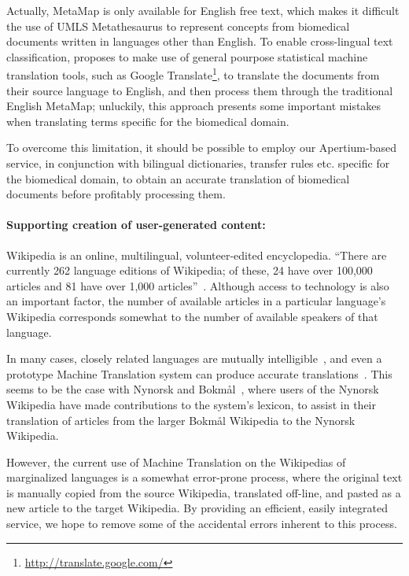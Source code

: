 \documentclass[11pt]{article}
\begin{document}
Actually, MetaMap is only available for English free text, which makes it difficult the use of UMLS Metathesaurus to represent concepts from biomedical documents written in languages other than English. To enable cross-lingual text classification, \cite{metamapes} proposes to make use of general pourpose statistical machine translation tools, such as Google %
Translate\footnote{\small\url{http://translate.google.com/}}, to translate the documents from their source language to English, and then process them through the traditional English MetaMap; unluckily, this approach presents some important mistakes when translating terms specific for the biomedical domain.

To overcome this limitation, it should be possible to employ our Apertium-based service, in conjunction with bilingual dictionaries, transfer rules etc. specific for the biomedical domain, to obtain an accurate translation of biomedical documents before profitably processing them.

\paragraph{Supporting creation of user-generated content:} Wikipedia is an online, multilingual, volunteer-edited encyclopedia. ``There are currently 262 language editions of Wikipedia; of these, 24 have over 100,000 articles and 81 have over 1,000 articles''~\citep{wikipedia}. Although access to technology is also an important factor, the number of available articles in a particular language's Wikipedia corresponds somewhat to the number of available speakers of that language.

In many cases, closely related languages are mutually intelligible~\citep{tyers09a}, and even a prototype Machine Translation system can produce accurate translations~\citep{oller06}. This seems to be the case with Nynorsk and Bokmål~\citep{unhammer09}, where users of the Nynorsk Wikipedia have made contributions to the system's lexicon, to assist in their translation of articles from the larger Bokmål Wikipedia to the Nynorsk Wikipedia.

However, the current use of Machine Translation on the Wikipedias of marginalized languages is a somewhat error-prone process, where the original text is manually copied from the source Wikipedia, translated off-line, and pasted as a new article to the target Wikipedia. By providing an efficient, easily integrated service, we hope to remove some of the accidental errors inherent to this process.
\end{document}
